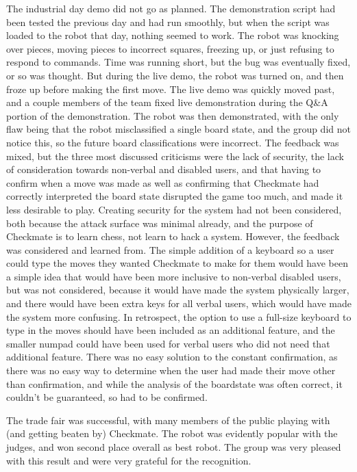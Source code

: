 \documentclass[onecolumn]{IEEEtran}
\begin{document}
The industrial day demo did not go as planned. The demonstration script had been tested the previous day and had run smoothly, but when the script was loaded to the robot that day, nothing seemed to work. The robot was knocking over pieces, moving pieces to incorrect squares, freezing up, or just refusing to respond to commands. Time was running short, but the bug was eventually fixed, or so was thought. But during the live demo, the robot was turned on, and then froze up before making the first move. The live demo was quickly moved past, and a couple members of the team fixed live demonstration during the Q\&A portion of the demonstration. The robot was then demonstrated, with the only flaw being that the robot misclassified a single board state, and the group did not notice this, so the future board classifications were incorrect. The feedback was mixed, but the three most discussed criticisms were the lack of security, the lack of consideration towards non-verbal and disabled users, and that having to confirm when a move was made as well as confirming that Checkmate had correctly interpreted the board state disrupted the game too much, and made it less desirable to play. Creating security for the system had not been considered, both because the attack surface was minimal already, and the purpose of Checkmate is to learn chess, not learn to hack a system. However, the feedback was considered and learned from. The simple addition of a keyboard so a user could type the moves they wanted Checkmate to make for them would have been a simple idea that would have been more inclusive to non-verbal disabled users, but was not considered, because it would have made the system physically larger, and there would have been extra keys for all verbal users, which would have made the system more confusing. In retrospect, the option to use a full-size keyboard to type in the moves should have been included as an additional feature, and the smaller numpad could have been used for verbal users who did not need that additional feature. There was no easy solution to the constant confirmation, as there was no easy way to determine when the user had made their move other than confirmation, and while the analysis of the boardstate was often correct, it couldn't be guaranteed, so had to be confirmed. \par
The trade fair was successful, with many members of the public playing with (and getting beaten by) Checkmate. The robot was evidently popular with the judges, and won second place overall as best robot. The group was very pleased with this result and were very grateful for the recognition. \\
 
\end{document}
